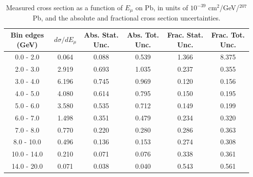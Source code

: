 \documentclass[aps,prl,twocolumn,superscriptaddress,nofootinbib]{revtex4-1}
\begin{document}
\begin{table}[h!]
  \centering
  \caption{Measured cross section as a function of $E_{\mu}$ on Pb, in units of
  $10^{-39}$ $\text{cm}^{2}$/GeV/$^{207}$Pb, and the absolute and
  fractional cross section uncertainties.}
    \begin{tabular}{c||c||c|c||c|c}
      Bin edges (GeV)  &  $d\sigma/dE_{\mu}$  &  Abs. Stat. Unc. & Abs. Tot. Unc.  &  Frac. Stat. Unc.  &  Frac. Tot. Unc. \\
      \hline\hline
        0.0 - 2.0 & 0.064 & 0.088 & 0.539 & 1.366 & 8.375 \\
        2.0 - 3.0 & 2.919 & 0.693 & 1.035 & 0.237 & 0.355 \\
        3.0 - 4.0 & 6.196 & 0.745 & 0.969 & 0.120 & 0.156 \\
        4.0 - 5.0 & 4.080 & 0.614 & 0.795 & 0.150 & 0.195 \\
        5.0 - 6.0 & 3.580 & 0.535 & 0.712 & 0.149 & 0.199 \\
        6.0 - 7.0 & 1.498 & 0.351 & 0.479 & 0.234 & 0.320 \\
        7.0 - 8.0 & 0.770 & 0.220 & 0.280 & 0.286 & 0.363 \\
       8.0 - 10.0 & 0.496 & 0.136 & 0.153 & 0.274 & 0.308 \\
      10.0 - 14.0 & 0.210 & 0.071 & 0.076 & 0.338 & 0.361 \\
      14.0 - 20.0 & 0.071 & 0.038 & 0.040 & 0.543 & 0.561 \\
    \end{tabular}
  \label{table:EmuXSec_Pb}
\end{table}
\clearpage
\end{document}
